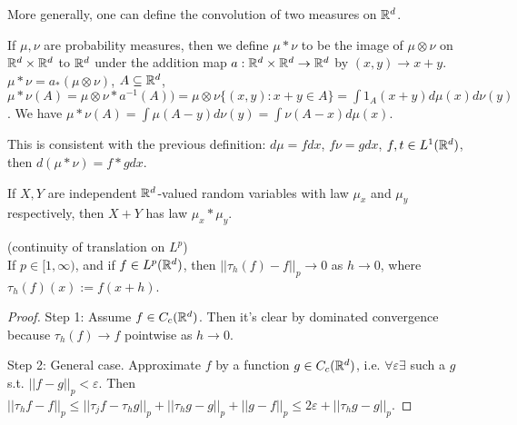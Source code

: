 \documentclass[a4paper]{article}
\begin{document}
\begin{defi}
More generally, one can define the convolution of two measures on $\mathbb{R}^d$.

If $\mu,\nu$ are probability measures, then we define $\mu*\nu$ to be the image of $\mu \otimes \nu$ on $\mathbb{R}^d \times \mathbb{R}^d$ to $\mathbb{R}^d$ under the addition map $a: \mathbb{R}^d \times \mathbb{R}^d \to \mathbb{R}^d$ by $(x,y) \to x+y$. $\mu*\nu = a_*(\mu\otimes \nu)$, $A \subseteq \mathbb{R}^d$, $\mu*\nu(A) = \mu \otimes \nu *a^{-1} (A)) = \mu\otimes \nu\{(x,y):x+y \in A\} = \int 1_A (x+y) d\mu(x) d\nu(y)$. We have $\mu*\nu(A) = \int \mu(A-y) d\nu(y) = \int \nu(A-x) d\mu(x)$.
\end{defi}

\begin{rem}
This is consistent with the previous definition: $d\mu = fdx$, $f\nu = gdx$, $f,t \in L^1(\mathbb{R}^d)$, then $d(\mu * \nu) = f*g dx$.

If $X,Y$ are independent $\mathbb{R}^d$-valued random variables with law $\mu_x$ and $\mu_y$ respectively, then $X+Y$ has law $\mu_x * \mu_y$.
\end{rem}

\begin{lemma} (continuity of translation on $L^p$)\\
If $p \in [1,\infty)$, and if $f \in L^p (\mathbb{R}^d)$, then $||\tau_h (f) - f||_p \to 0$ as $h \to 0$, where $\tau_h (f) (x) := f(x+h)$.
\begin{proof}
Step 1: Assume $f \in C_c(\mathbb{R}^d)$. Then it's clear by dominated convergence because $\tau_h(f) \to f$ pointwise as $h \to 0$.

Step 2: General case. Approximate $f$ by a function $g \in C_c(\mathbb{R}^d)$, i.e. $\forall \varepsilon \exists$ such a $g$ s.t. $||f-g||_p < \varepsilon$. Then $||\tau_h f-f||_p \leq ||\tau_j f - \tau_h g||_p + ||\tau_h g - g||_p + ||g-f||_p \leq 2\varepsilon + ||\tau_h g-g||_p$.
\end{proof}
\end{lemma}
\end{document}
